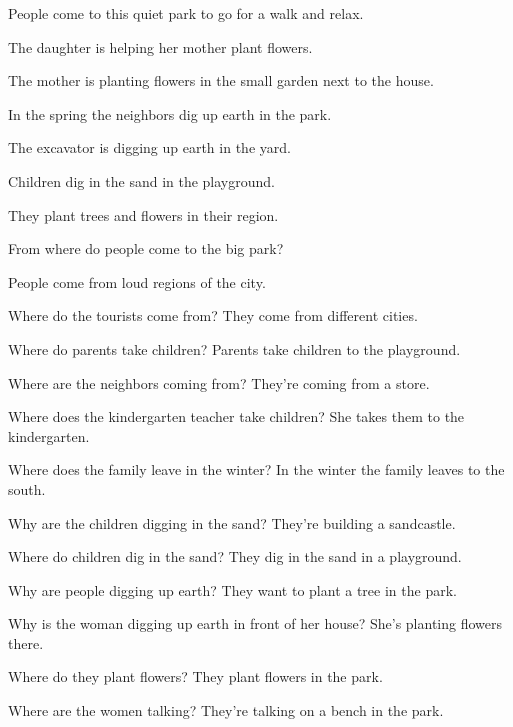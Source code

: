 \documentclass[11pt,a4paper]{article}
\begin{document}
People come to this quiet park to go for a walk and relax.

The daughter is helping her mother plant flowers.

The mother is planting flowers in the small garden next to the house.

In the spring the neighbors dig up earth in the park.

The excavator is digging up earth in the yard.

Children dig in the sand in the playground.

They plant trees and flowers in their region.

From where do people come to the big park?

People come from loud regions of the city.

Where do the tourists come from? They come from different cities.

Where do parents take children? Parents take children to the playground.

Where are the neighbors coming from? They're coming from a store.

Where does the kindergarten teacher take children? She takes them to the
kindergarten.

Where does the family leave in the winter? In the winter the family leaves to
the south.

Why are the children digging in the sand? They're building a sandcastle.

Where do children dig in the sand? They dig in the sand in a playground.

Why are people digging up earth? They want to plant a tree in the park.

Why is the woman digging up earth in front of her house? She's planting flowers
there.

Where do they plant flowers? They plant flowers in the park.

Where are the women talking? They're talking on a bench in the park.
\end{document}
